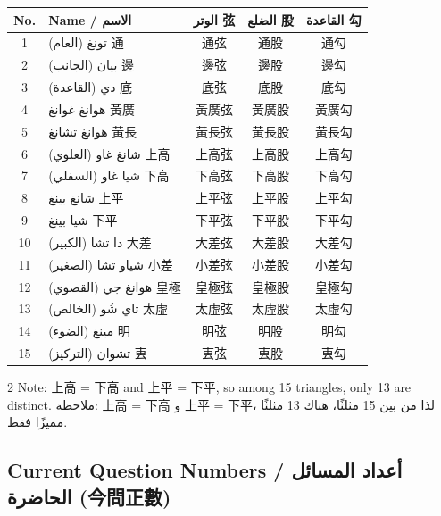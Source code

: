 \documentclass[11pt,a4paper]{article}
\newcommand{\ar}[1]{\arabicfont\beginR #1\endR}
\begin{document}
\begin{center}
\begin{tabular}{|c|l|c|c|c|}
\hline
\textbf{No.} & \textbf{Name / \ar{الاسم}} & \textbf{\ar{الوتر} 弦} & \textbf{\ar{الضلع} 股} & \textbf{\ar{القاعدة} 勾} \\
\hline
1 & \ar{تونغ (العام)} 通 & 通弦 & 通股 & 通勾 \\
2 & \ar{بيان (الجانب)} 邊 & 邊弦 & 邊股 & 邊勾 \\
3 & \ar{دي (القاعدة)} 底 & 底弦 & 底股 & 底勾 \\
4 & \ar{هوانغ غوانغ} 黃廣 & 黃廣弦 & 黃廣股 & 黃廣勾 \\
5 & \ar{هوانغ تشانغ} 黃長 & 黃長弦 & 黃長股 & 黃長勾 \\
6 & \ar{شانغ غاو (العلوي)} 上高 & 上高弦 & 上高股 & 上高勾 \\
7 & \ar{شيا غاو (السفلي)} 下高 & 下高弦 & 下高股 & 下高勾 \\
8 & \ar{شانغ بينغ} 上平 & 上平弦 & 上平股 & 上平勾 \\
9 & \ar{شيا بينغ} 下平 & 下平弦 & 下平股 & 下平勾 \\
10 & \ar{دا تشا (الكبير)} 大差 & 大差弦 & 大差股 & 大差勾 \\
11 & \ar{شياو تشا (الصغير)} 小差 & 小差弦 & 小差股 & 小差勾 \\
12 & \ar{هوانغ جي (القصوي)} 皇極 & 皇極弦 & 皇極股 & 皇極勾 \\
13 & \ar{تاي شُو (الخالص)} 太虛 & 太虛弦 & 太虛股 & 太虛勾 \\
14 & \ar{مينغ (الضوء)} 明 & 明弦 & 明股 & 明勾 \\
15 & \ar{تشوان (التركيز)} 叀 & 叀弦 & 叀股 & 叀勾 \\
\hline
\end{tabular}
\end{center}

\begin{paracol}{2}
\small Note: 上高 = 下高 and 上平 = 下平, so among 15 triangles, only 13 are distinct.
\switchcolumn
\small \ar{ملاحظة: 上高 = 下高 و 上平 = 下平، لذا من بين 15 مثلثًا، هناك 13 مثلثًا مميزًا فقط.}
\end{paracol}

\subsection{Current Question Numbers / \ar{أعداد المسائل الحاضرة} (今問正數)}
\label{subsec:numbers}
\end{document}
